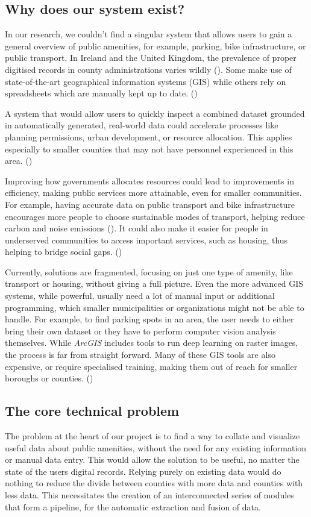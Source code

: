 \subsection{Why does our system exist?}
In our research, we couldn't find a singular system that allows users to gain a
general overview of public amenities, for example, parking, bike infrastructure,
or public transport. In Ireland and the United Kingdom, the prevalence of proper
digitised records in county administrations varies wildly
(\cite{WebAccessibilityIreland}). Some make use of state-of-the-art geographical
information systems (GIS) while others rely on spreadsheets which are manually
kept up to date. (\cite{mcguirk2001changing})

\noindent{}A system that would allow users to quickly inspect a combined dataset
grounded in automatically generated, real-world data could accelerate processes
like planning permissions, urban development, or resource allocation. This
applies especially to smaller counties that may not have personnel experienced
in this area. (\cite{clark2002amenities})

\noindent{}Improving how governments allocates resources could lead to
improvements in efficiency, making public services more attainable, even for
smaller communities. For example, having accurate data on public transport and
bike infrastructure encourages more people to choose sustainable modes of
transport, helping reduce carbon and noise emissions (\cite{MUGION20181566}). It
could also make it easier for people in underserved communities to access
important services, such as housing, thus helping to bridge social gaps.
(\cite{allen2015understanding})

\noindent{}Currently, solutions are fragmented, focusing on just one type of
amenity, like transport or housing, without giving a full picture. Even the more
advanced GIS systems, while powerful, usually need a lot of manual input or
additional programming, which smaller municipalities or organizations might not
be able to handle. For example, to find parking spots in an area, the user needs to
either bring their own dataset or they have to perform computer vision analysis
themselves. While \textit{ArcGIS} includes tools to run deep learning on raster
images, the process is far from straight forward. Many of these GIS tools are also
expensive, or require specialised training, making them out of reach for smaller
boroughs or counties. (\cite{kaufmann2022scaling})

\subsection{The core technical problem}
The problem at the heart of our project is to find a way to collate and
visualize useful data about public amenities, without the need for any existing
information or manual data entry. This would allow the solution to be useful, no
matter the state of the users digital records. Relying purely on existing data
would do nothing to reduce the divide between counties with more data and
counties with less data. This necessitates the creation of an interconnected
series of modules that form a pipeline, for the automatic extraction and fusion
of data.

